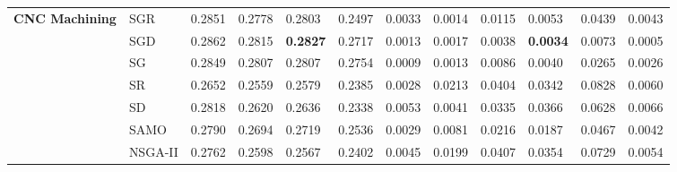 \begin{table*}[!htb]
\begin{tabular}{|l|l|l|l|l|l|l|l|l|l|l|l|}
		\multirow{7}{*}{\textbf{CNC Machining}}                    & SGR                 & 0.2851         & 0.2778         & 0.2803           & 0.2497          & 0.0033    & 0.0014         & 0.0115         & 0.0053           & 0.0439          & 0.0043                \\ 
		& SGD                 & 0.2862         & 0.2815         & \textbf{0.2827}           & 0.2717          & 0.0013     & 0.0017         & 0.0038         & \textbf{0.0034}           & 0.0073          & 0.0005              \\ 
		& SG                  & 0.2849         & 0.2807         & 0.2807           & 0.2754          & 0.0009               & 0.0013         & 0.0086         & 0.0040           & 0.0265          & 0.0026               \\ 
		& SR                  & 0.2652         & 0.2559         & 0.2579           & 0.2385          & 0.0028               & 0.0213         & 0.0404         & 0.0342           & 0.0828          & 0.0060             \\ 
		& SD                  & 0.2818         & 0.2620         & 0.2636           & 0.2338          & 0.0053           & 0.0041         & 0.0335         & 0.0366           & 0.0628          & 0.0066              \\ 
		& SAMO                & 0.2790         & 0.2694         & 0.2719           & 0.2536          & 0.0029         & 0.0081         & 0.0216         & 0.0187           & 0.0467          & 0.0042              \\
		& NSGA-II             & 0.2762         & 0.2598         & 0.2567           & 0.2402          & 0.0045        & 0.0199         & 0.0407         & 0.0354           & 0.0729          & 0.0054                \\ \hline
		

\end{tabular}
\end{table*}
